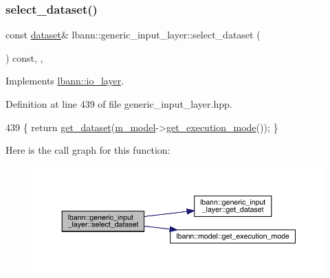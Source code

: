 \subsubsection{\texorpdfstring{select\+\_\+dataset()}{select\_dataset()}\hspace{0.1cm}{\footnotesize\ttfamily [2/2]}}
{\footnotesize\ttfamily const \hyperlink{classlbann_1_1dataset}{dataset}\& lbann\+::generic\+\_\+input\+\_\+layer\+::select\+\_\+dataset (\begin{DoxyParamCaption}{ }\end{DoxyParamCaption}) const\hspace{0.3cm}{\ttfamily [inline]}, {\ttfamily [override]}, {\ttfamily [virtual]}}



Implements \hyperlink{classlbann_1_1io__layer_abbbeb6ca3e1d95b5c35dd9bb499bdd2d}{lbann\+::io\+\_\+layer}.



Definition at line 439 of file generic\+\_\+input\+\_\+layer.\+hpp.


\begin{DoxyCode}
439 \{ \textcolor{keywordflow}{return} \hyperlink{classlbann_1_1generic__input__layer_af5699540797c22d8846028e578a6fc59}{get\_dataset}(\hyperlink{classlbann_1_1Layer_a3d9315e99574166f2f33e37b572021d2}{m\_model}->\hyperlink{classlbann_1_1model_addb40597cf29aa6d31b6a7d09ef48608}{get\_execution\_mode}()); \}
\end{DoxyCode}
Here is the call graph for this function\+:\nopagebreak
\begin{figure}[H]
\begin{center}
\leavevmode
\includegraphics[width=350pt]{classlbann_1_1generic__input__layer_ab8468d077867b03098bbc71a38edaa15_cgraph}
\end{center}
\end{figure}
\mbox{\label{classlbann_1_1generic__input__layer_a777aa11816a518098212408b569b6fb8}} 
